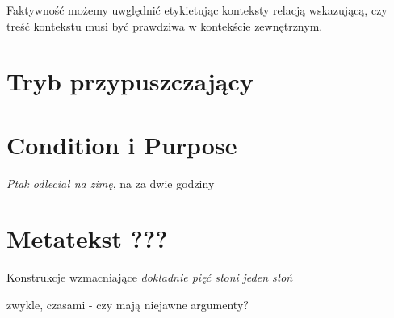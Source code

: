 \documentclass[a4paper,12pt]{article}
\begin{document}
Faktywność możemy uwględnić etykietując konteksty relacją wskazującą,
czy treść kontekstu musi być prawdziwa w kontekście zewnętrznym.


\section{Tryb przypuszczający}

\section{Condition i Purpose}
{\it Ptak odleciał na zimę}, 
na za dwie godziny




\section{Metatekst ???}
Konstrukcje wzmacniające
{\it dokładnie pięć słoni}
{\it jeden słoń}


zwykle, czasami - czy mają niejawne argumenty?
\end{document}
